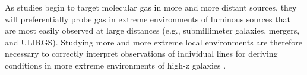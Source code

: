 \documentclass{aastex62}
\begin{document}
As studies begin to target molecular gas in more and more distant sources, they will preferentially probe gas in extreme environments of luminous sources that are most easily observed at large distances (e.g., submillimeter galaxies, mergers, and ULIRGS). Studying more and more extreme local environments are therefore necessary to correctly interpret observations of individual lines for deriving conditions in more extreme environments of high-z galaxies \citep[e.g.,][]{Swinbank11}.



\end{document}
